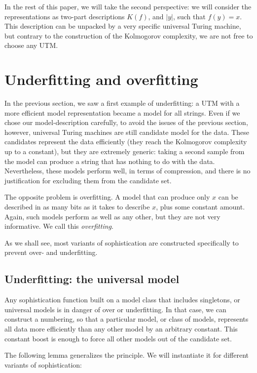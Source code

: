 \documentclass{style/llncs}
\begin{document}
In the rest of this paper, we will take the second perspective: we will consider the representations as two-part descriptions $K(f)$, and $|y|$, such that $f(y)=x$. This description can be unpacked by a very specific universal Turing machine, but contrary to the construction of the Kolmogorov complexity, we are not free to choose any UTM.

\section{Underfitting and overfitting}

In the previous section, we saw a first example of underfitting: a UTM with a more efficient model representation became a model for all strings. Even if we chose our model-description carefully, to avoid the issues of the previous section, however, universal Turing machines are still candidate model for the data. These candidates represent the data efficiently (they reach the Kolmogorov complexity up to a constant), but they are extremely generic: taking a second sample from the model can produce a string that has nothing to do with the data. Nevertheless, these models perform well, in terms of compression, and there is no justification for excluding them from the candidate set.

The opposite problem is overfitting. A model that can produce only $x$ can be described in as many bits as it takes to describe $x$, plus some constant amount. Again, such models perform as well as any other, but they are not very informative. We call this \emph{overfitting}.

As we shall see, most variants of sophistication are constructed specifically to prevent over- and underfitting.


\subsection{Underfitting: the universal model}

Any sophistication function built on a model class that includes singletons, or universal models is in danger of over or underfitting. In that case, we can construct a numbering, so that a particular model, or class of models, represents all data more efficiently than any other model by an arbitrary constant. This constant boost is enough to force all other models out of the candidate set. 

The following lemma generalizes the principle. We will instantiate it for different variants of sophistication: 
\end{document}
